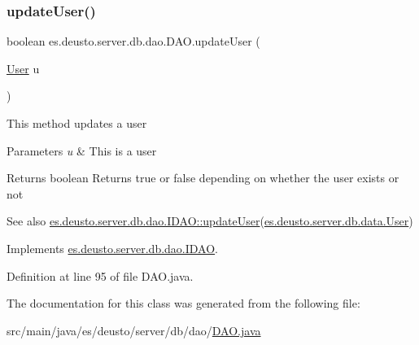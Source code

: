 \subsubsection{\texorpdfstring{update\+User()}{updateUser()}}
{\footnotesize\ttfamily boolean es.\+deusto.\+server.\+db.\+dao.\+D\+A\+O.\+update\+User (\begin{DoxyParamCaption}\item[{\hyperlink{classes_1_1deusto_1_1server_1_1db_1_1data_1_1_user}{User}}]{u }\end{DoxyParamCaption})}

This method updates a user 
\begin{DoxyParams}{Parameters}
{\em u} & This is a user \\
\hline
\end{DoxyParams}
\begin{DoxyReturn}{Returns}
boolean Returns true or false depending on whether the user exists or not 
\end{DoxyReturn}
\begin{DoxySeeAlso}{See also}
\hyperlink{interfacees_1_1deusto_1_1server_1_1db_1_1dao_1_1_i_d_a_o_a790b00e2989b634c1bbb2c6620ff3583}{es.\+deusto.\+server.\+db.\+dao.\+I\+D\+A\+O\+::update\+User}(\hyperlink{classes_1_1deusto_1_1server_1_1db_1_1data_1_1_user}{es.\+deusto.\+server.\+db.\+data.\+User}) 
\end{DoxySeeAlso}


Implements \hyperlink{interfacees_1_1deusto_1_1server_1_1db_1_1dao_1_1_i_d_a_o_a790b00e2989b634c1bbb2c6620ff3583}{es.\+deusto.\+server.\+db.\+dao.\+I\+D\+AO}.



Definition at line 95 of file D\+A\+O.\+java.



The documentation for this class was generated from the following file\+:\begin{DoxyCompactItemize}
\item 
src/main/java/es/deusto/server/db/dao/\hyperlink{_d_a_o_8java}{D\+A\+O.\+java}\end{DoxyCompactItemize}
